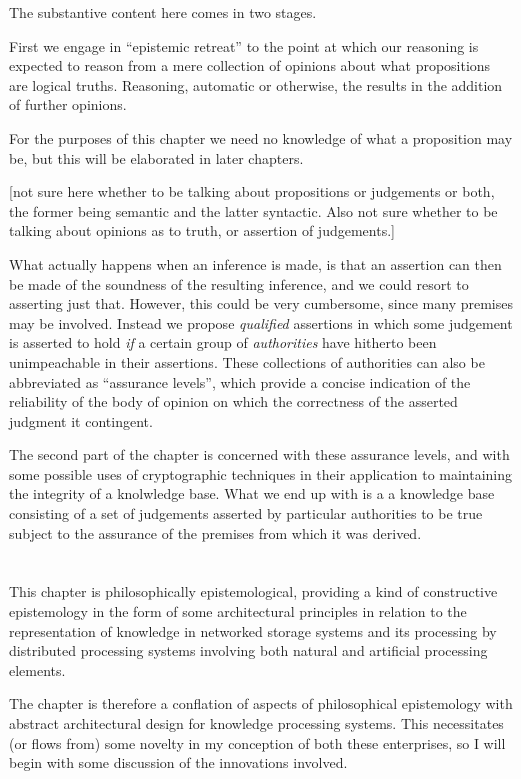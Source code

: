 The substantive content here comes in two stages.

First we engage in ``epistemic retreat'' to the point at which our
reasoning is expected to reason from a mere collection of opinions
about what propositions are logical truths.
Reasoning, automatic or otherwise, the results in the addition of
further opinions.

For the purposes of this chapter we need no knowledge of what a proposition
may be, but this will be elaborated in later chapters.

[not sure here whether to be talking about propositions or judgements or
both, the former being semantic and the latter syntactic.
Also not sure whether to be talking about opinions as to truth, or assertion
of judgements.]

What actually happens when an inference is made, is that an assertion can
then be made of the soundness of the resulting inference, and we could resort
to asserting just that.
However, this could be very cumbersome, since many premises may be involved.
Instead we propose {\it qualified} assertions in which some judgement is asserted
to hold {\it if} a certain group of {\it authorities} have hitherto been
unimpeachable in their assertions.
These collections of authorities can also be abbreviated as ``assurance levels'',
which provide a concise indication of the reliability of the body of opinion
on which the correctness of the asserted judgment it contingent.

The second part of the chapter is concerned with these assurance levels,
and with some possible uses of cryptographic techniques in their application
to maintaining the integrity of a knolwledge base.
What we end up with is a a knowledge base consisting of a set
of judgements asserted by particular authorities to be true subject to the 
assurance of the premises from which it was derived.


\section{}


This chapter is philosophically epistemological, providing a kind of
constructive epistemology in the form of some architectural principles
in relation to the representation of knowledge in networked storage
systems and its processing by distributed processing systems involving
both natural and artificial processing elements. 

The chapter is therefore a conflation of aspects of philosophical
epistemology with abstract architectural design for knowledge
processing systems. 
This necessitates (or flows from) some novelty in my conception of
both these enterprises, so I will begin with some discussion of the
innovations involved. 

